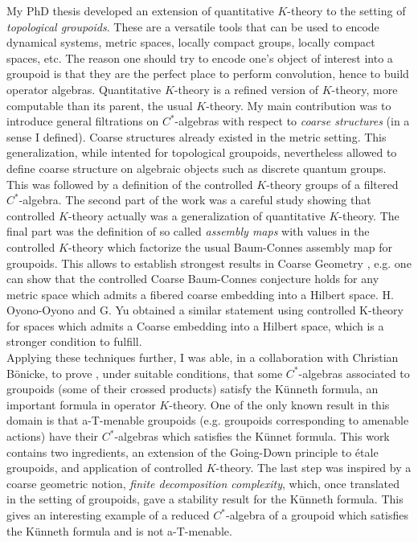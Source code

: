 \documentclass[a4paper]{article}
\begin{document}
My PhD thesis developed an extension of quantitative $K$-theory to the setting of \textit{topological groupoids}. These are a versatile tools that can be used to encode dynamical systems, metric spaces, locally compact groups, locally compact spaces, etc. The reason one should try to encode one's object of interest into a groupoid is that they are the perfect place to perform convolution, hence to build operator algebras. Quantitative $K$-theory is a refined version of $K$-theory, more computable than its parent, the usual $K$-theory. My main contribution was to introduce general filtrations on $C^*$-algebras with respect to \textit{coarse structures} (in a sense I defined). Coarse structures already existed in the metric setting. This generalization, while intented for topological groupoids, nevertheless allowed to define coarse structure on algebraic objects such as discrete quantum groups. This was followed by a definition of the controlled $K$-theory groups of a filtered $C^*$-algebra. The second part of the work was a careful study showing that controlled $K$-theory actually was a generalization of quantitative $K$-theory. The final part was the definition of so called \textit{assembly maps} with values in the controlled $K$-theory which factorize the usual Baum-Connes assembly map for groupoids. This allows to establish strongest results in Coarse Geometry , e.g. one can show that the controlled Coarse Baum-Connes conjecture holds for any metric space which admits a fibered coarse embedding into a Hilbert space. H. Oyono-Oyono and G. Yu obtained a similar statement using controlled K-theory for spaces which admits a Coarse embedding into a Hilbert space, which is a stronger condition to fulfill.\\ 

Applying these techniques further, I was able, in a collaboration with Christian B\"onicke, to prove , under suitable conditions, that some $C^*$-algebras associated to groupoids (some of their crossed products) satisfy the K\"unneth formula, an important formula in operator $K$-theory. One of the only known result in this domain is that a-T-menable groupoids (e.g. groupoids corresponding to amenable actions) have their $C^*$-algebras which satisfies the K\"unnet formula. This work contains two ingredients, an extension of the Going-Down principle to \'etale groupoids, and application of controlled $K$-theory. The last step was inspired by a coarse geometric notion, \textit{finite decomposition complexity}, which, once translated in the setting of groupoids, gave a stability result for the K\"unneth formula. This gives an interesting example of a reduced $C^*$-algebra of a groupoid which satisfies the K\"unneth formula and is not a-T-menable.\\
\end{document}
